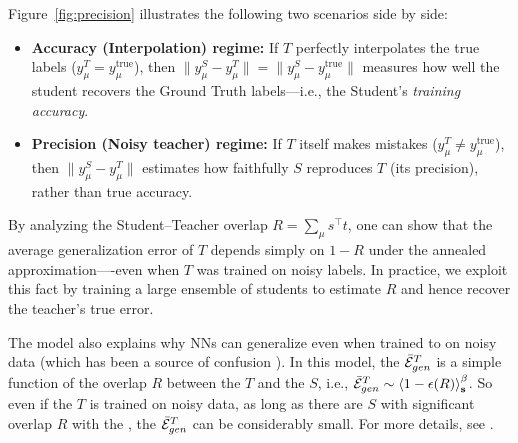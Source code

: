 

Figure~\ref{fig:precision} illustrates the following two scenarios side by side:
\begin{itemize}
  \item \textbf{Accuracy (Interpolation) regime:}
    If $T$ perfectly interpolates the true labels ($y^T_\mu = y^\text{true}_\mu$), then
    \( \|y^S_\mu - y^T_\mu\| = \|y^S_\mu - y^\text{true}_\mu\| \)
    measures how well the student recovers the Ground Truth labels—i.e., the Student's \emph{training accuracy}.

  \item \textbf{Precision (Noisy teacher) regime:}
    If $T$ itself makes mistakes ($y^T_\mu \neq y^\text{true}_\mu$), then
    \( \|y^S_\mu - y^T_\mu\| \)
    estimates how faithfully $S$ reproduces $T$ (its precision), rather than true accuracy.
\end{itemize}

By analyzing the Student–Teacher overlap $R = \sum_\mu s^{\top} t$, one can show that the average generalization error of $T$ depends simply on $1-R$ under the annealed approximation—-even when $T$ was trained on noisy labels. In practice, we exploit this fact by training a large ensemble of students to estimate $R$ and hence recover the teacher’s true error.
%

%
The \StudentTeacher model also explains why NNs can generalize even when trained to \Interpolation on noisy data (which has been a source of confusion \cite{Understanding16_TR}). In this model, the \GeneralizationError $\bar{\mathcal{E}}_{gen}^{T}$ is a simple function of the overlap $R$ between the \Teacher $T$ and the \Students $S$, i.e., $\bar{\mathcal{E}}_{gen}^{T}\sim \left\langle 1-\epsilon(R) \right\rangle_{\mathbf s}^{\beta}$. So even if the \Teacher $T$ is trained on noisy data, as long as there are \Students $S$ with significant overlap $R$ with the \Teacher, the \Teacher \GeneralizationError $\bar{\mathcal{E}}_{gen}^{T}$ can be considerably small. For more details, see \cite{MM17_TR_v1}.


